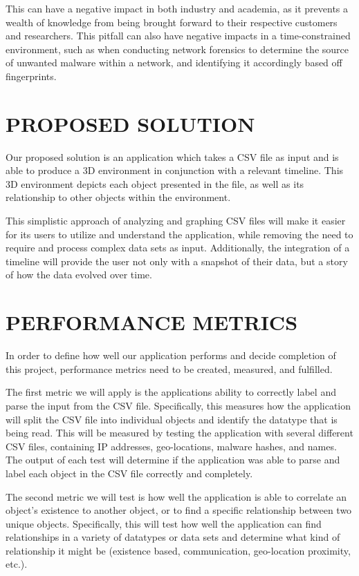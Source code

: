 \documentclass[letterpaper,10pt,titlepage, onecolumn]{IEEEtran}
\begin{document}
 This can have a negative impact in both industry and academia, as it prevents a wealth of knowledge from being brought forward to their respective customers and researchers. This pitfall can also have negative impacts in a time-constrained environment, such as when conducting network forensics to determine the source of unwanted malware within a network, and identifying it accordingly based off fingerprints. 

\section*{PROPOSED SOLUTION}
Our proposed solution is an application which takes a CSV file as input and is able to produce a 3D environment in conjunction with a relevant timeline. This 3D environment depicts each object presented in the file, as well as its relationship to other objects within the environment. 

This simplistic approach of analyzing and graphing CSV files will make it easier for its users to utilize and understand the application, while removing the need to require and process complex data sets as input. Additionally, the integration of a timeline will provide the user not only with a snapshot of their data, but a story of how the data evolved over time.

\section*{PERFORMANCE METRICS}
In order to define how well our application performs and decide completion of this project, performance metrics need to be created, measured, and fulfilled. 

The first metric we will apply is the applications ability to correctly label and parse the input from the CSV file. Specifically, this measures how the application will split the CSV file into individual objects and identify the datatype that is being read. This will be measured by testing the application with several different CSV files, containing IP addresses, geo-locations, malware hashes, and names. The output of each test will determine if the application was able to parse and label each object in the CSV file correctly and completely.

The second metric we will test is how well the application is able to correlate an object’s existence to another object, or to find a specific relationship between two unique objects. Specifically, this will test how well the application can find relationships in a variety of datatypes or data sets and determine what kind of relationship it might be (existence based, communication, geo-location proximity, etc.).
\end{document}
